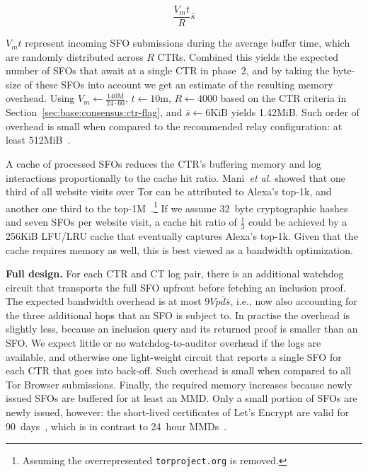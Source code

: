 \begin{equation} \label{eq:memory}
	\frac{V_mt}{R} \bar{s}
\end{equation}

$V_mt$ represent incoming SFO submissions during the average buffer time, which
are randomly distributed across $R$ CTRs.  Combined this yields the expected
number of SFOs that await at a single CTR in phase~2, and by taking the
byte-size of these SFOs into account we get an estimate of the resulting memory
overhead.  Using
	$V_m \gets \frac{140\textrm{M}}{24\cdot60}$,
	$t \gets 10$m,
	$R \gets 4000$ based on the CTR criteria in
		Section~\ref{sec:base:consensus:ctr-flag}, and
	$\bar{s} \gets 6\textrm{KiB}$
yields 1.42MiB.  Such order of overhead is small when compared to the
recommended relay configuration:
	at least 512MiB~\cite{relay-config}.

A cache of processed SFOs reduces the CTR's buffering memory and log
interactions proportionally to the cache hit ratio.  Mani~\emph{et al.} showed
that one third of all website visits over Tor can be attributed to Alexa's
top-1k, and another one third to the top-1M~\cite{mani}.\footnote{%
	Assuming the overrepresented
	\texttt{torproject.org} is removed.
} If we assume 32~byte cryptographic hashes and seven SFOs per website visit,
a cache hit ratio of $\frac{1}{3}$ could be achieved by a 256KiB LFU/LRU cache
that eventually captures Alexa's top-1k.  Given that the cache requires
memory as well, this is best viewed as a bandwidth optimization.

\textbf{Full design.}
For each CTR and CT log pair, there is an additional watchdog circuit that
transports the full SFO upfront before fetching an inclusion proof.  The
expected bandwidth overhead is at most $9Vp\bar{d}\bar{s}$, i.e., now
also accounting for the three additional hops that an SFO is subject to.  In
practise the overhead is slightly less, because an inclusion query and its
returned proof is smaller than an SFO.  We expect little or no
watchdog-to-auditor overhead if the logs are available, and otherwise one
light-weight circuit that reports a single SFO for each CTR that goes into
back-off.  Such overhead is small when compared to all Tor Browser submissions.
Finally, the required memory increases because newly issued SFOs are buffered
for at least an MMD.  Only a small portion of SFOs are newly issued, however:
	the short-lived certificates of Let's Encrypt are valid for
	90~days~\cite{le}, which is in contrast to 24~hour
	MMDs~\cite{google-log-policy}.
